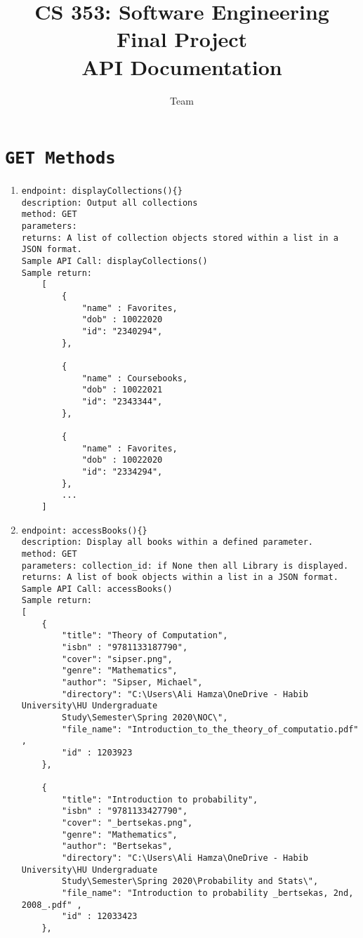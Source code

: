 \documentclass[a4paper, 11pt]{article}
\title{CS 353: Software Engineering \\ {\Large Final Project} \\ {\large API Documentation}}
\author{Team \Maaruf}
\begin{document}
\maketitle
\section{\texttt{GET Methods}}
\begin{enumerate}
\item
\begin{verbatim}
endpoint: displayCollections(){} 
description: Output all collections
method: GET
parameters: 
returns: A list of collection objects stored within a list in a JSON format.
Sample API Call: displayCollections()
Sample return:
    [
        {
            "name" : Favorites,
            "dob" : 10022020
            "id": "2340294",
        },

        {
            "name" : Coursebooks,
            "dob" : 10022021
            "id": "2343344",
        },
        
        {
            "name" : Favorites,
            "dob" : 10022020
            "id": "2334294",
        },
        ...
    ]
\end{verbatim}
\item 
\begin{verbatim}
endpoint: accessBooks(){} 
description: Display all books within a defined parameter.
method: GET
parameters: collection_id: if None then all Library is displayed.
returns: A list of book objects within a list in a JSON format.
Sample API Call: accessBooks()
Sample return:
[
    {
        "title": "Theory of Computation", 
        "isbn" : "9781133187790", 
        "cover": "sipser.png",
        "genre": "Mathematics", 
        "author": "Sipser, Michael", 
        "directory": "C:\Users\Ali Hamza\OneDrive - Habib University\HU Undergraduate 
        Study\Semester\Spring 2020\NOC\", 
        "file_name": "Introduction_to_the_theory_of_computatio.pdf" , 
        "id" : 1203923
    },

    {
        "title": "Introduction to probability", 
        "isbn" : "9781133427790", 
        "cover": "_bertsekas.png",
        "genre": "Mathematics", 
        "author": "Bertsekas", 
        "directory": "C:\Users\Ali Hamza\OneDrive - Habib University\HU Undergraduate 
        Study\Semester\Spring 2020\Probability and Stats\", 
        "file_name": "Introduction to probability _bertsekas, 2nd, 2008_.pdf" , 
        "id" : 12033423
    },


\end{verbatim}
\end{enumerate}
\end{document}
